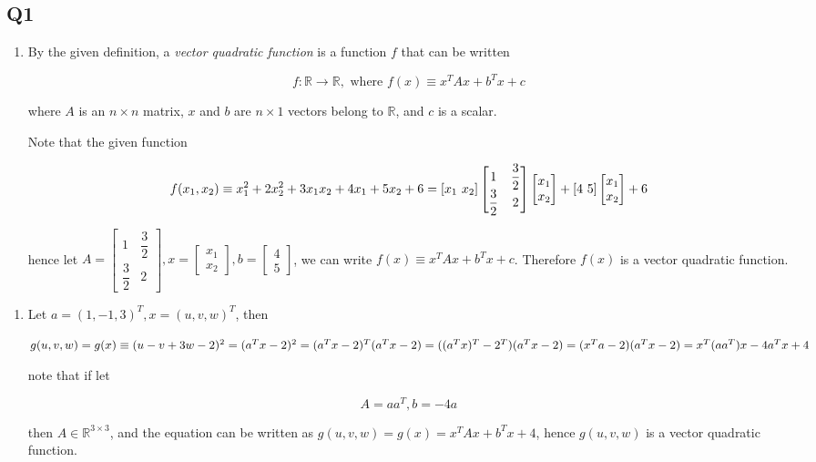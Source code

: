 \documentclass[
]{article}
\author{}
\date{}
\begin{document}
\hypertarget{q1}{%
\subsection{Q1}\label{q1}}

\begin{enumerate}
\def\labelenumi{\arabic{enumi}.}
\item
  By the given definition, a \emph{vector quadratic function} is a
  function \(f\) that can be written

  \[f:\mathbb{R}\to \mathbb{R},\text{ where } f(x)\equiv x^TAx+b^Tx+c\]

  where \(A\) is an \(n\times n\) matrix, \(x\) and \(b\) are
  \(n\times1\) vectors belong to \(\mathbb{R}\), and \(c\) is a scalar.

  Note that the given function

  \[f(x_1,x_2)\equiv x_1^2+2x_2^2+3x_1x_2+4x_1+5x_2+6\\=[x_1\ x_2]

  \begin{bmatrix}1&\dfrac{3}{2}\\\dfrac{3}{2}&2\end{bmatrix}\begin{bmatrix}x_1\\x_2\end{bmatrix}+[4\ 5]\begin{bmatrix}x_1\\x_2\end{bmatrix}+6\]

  hence let
  \(A=\begin{bmatrix}1&\dfrac{3}{2}\\\dfrac{3}{2}&2\end{bmatrix},x=\begin{bmatrix}x_1\\x_2\end{bmatrix},b=\begin{bmatrix}4\\5\end{bmatrix}\),
  we can write \(f(x)\equiv x^TAx+b^Tx+c\). Therefore \(f(x)\) is a
  vector quadratic function.
\end{enumerate}

\begin{enumerate}
\def\labelenumi{\arabic{enumi}.}
\item
  Let \(a=(1,-1,3)^T,x=(u,v,w)^T\), then

  \(g(u,v,w)=g(x)\equiv(u-v+3w-2)^2=(a^Tx-2)^2=(a^Tx-2)^T(a^Tx-2)\\=((a^Tx)^T-2^T)(a^Tx-2)=(x^Ta-2)(a^Tx-2)=x^T(aa^T)x-4a^Tx+4\)

  note that if let

  \[A=aa^T,b=-4a\]

  then \(A\in\mathbb{R}^{3\times 3}\), and the equation can be written
  as \(g(u,v,w)=g(x)=x^TAx+b^Tx+4\), hence \(g(u,v,w)\) is a vector
  quadratic function.
\end{enumerate}
\end{document}
